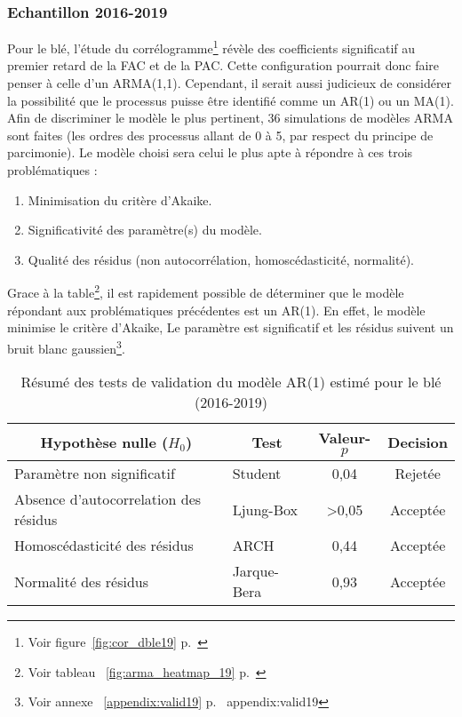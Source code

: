 \subsubsection{Echantillon 2016-2019}
Pour le blé, l'étude du corrélogramme\footnote{Voir figure~\ref{fig:cor_dble19} p.~\pageref{fig:cor_dble19}} révèle des coefficients significatif au premier retard de la 
FAC et de la PAC. Cette configuration pourrait donc faire penser à celle d'un ARMA(1,1). Cependant, il serait aussi judicieux de considérer la possibilité que le processus 
puisse être identifié comme un AR(1) ou un MA(1). Afin de discriminer le modèle le plus pertinent, 36 simulations de modèles ARMA sont faites (les ordres des processus 
allant de 0 à 5, par respect du principe de parcimonie). Le modèle choisi sera celui le plus apte à répondre à ces trois problématiques : 
\begin{enumerate}
    \item Minimisation du critère d'Akaike.
    \item Significativité des paramètre(s) du modèle.
    \item Qualité des résidus (non autocorrélation, homoscédasticité, normalité).
\end{enumerate}
Grace à la table\footnote{Voir tableau ~\ref{fig:arma_heatmap_19} p.~\pageref{fig:arma_heatmap_19}}, il est rapidement possible de déterminer que le modèle répondant aux 
problématiques précédentes est un AR(1). En effet, le modèle minimise le 
critère d'Akaike, Le paramètre est significatif et les résidus suivent un bruit blanc gaussien\footnote{Voir annexe ~\ref{appendix:valid19} p.~\pageref
{appendix:valid19}}. 
\begin{table}[H]
    \centering
    \caption{Résumé des tests de validation du modèle AR(1) estimé pour le blé (2016-2019)}
    \sffamily
    \begin{tabular}{llcc}
    \toprule
    \multicolumn{1}{c}{Hypothèse nulle ($H_{0}$)} & \multicolumn{1}{c}{Test} & Valeur-$p$      & Decision \\
    \midrule
    Paramètre non significatif              & Student       &    0,04       &  Rejetée  \\
    Absence d'autocorrelation des résidus   & Ljung-Box     &    >0,05      &  Acceptée \\
    Homoscédasticité des résidus            & ARCH          &    0,44       &  Acceptée \\
    Normalité des résidus                   & Jarque-Bera   &    0,93       &  Acceptée \\
    \bottomrule
    \end{tabular}
\end{table}
